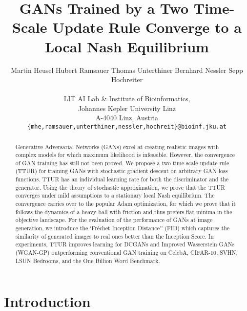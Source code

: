 \documentclass{article}
\begin{document}
\title{GANs Trained by a Two Time-Scale Update Rule
Converge to a Local Nash Equilibrium}

\author{
 Martin Heusel
 \And
 Hubert Ramsauer
 \And
 Thomas Unterthiner
\And
 Bernhard Nessler
 \And
 Sepp Hochreiter\\
  \\
LIT AI Lab \& Institute of Bioinformatics, \\
 Johannes Kepler University Linz\\
 A-4040 Linz, Austria\\
\texttt{\{mhe,ramsauer,unterthiner,nessler,hochreit\}@bioinf.jku.at}
}

\maketitle

\begin{abstract}
Generative Adversarial Networks (GANs) excel at creating realistic images with
complex models for which maximum likelihood is infeasible. However, the
convergence of GAN training has still not been proved.
We propose a two time-scale update rule (TTUR) for training GANs with stochastic
gradient descent on arbitrary GAN loss functions.
TTUR has an individual learning rate for both the discriminator
and the generator. Using the theory of stochastic approximation, we
prove that the TTUR converges under mild assumptions to a stationary local Nash equilibrium.
The convergence carries over to the popular Adam optimization, for which we
prove that it follows the dynamics of a heavy ball with friction and thus
prefers flat minima in the objective landscape.
For the evaluation of the performance of GANs at image generation, we introduce
the `Fr\'{e}chet Inception Distance'' (FID) which captures the similarity of
generated images to real ones better than the Inception Score. In experiments,
TTUR improves learning for DCGANs and Improved Wasserstein GANs (WGAN-GP)
outperforming conventional GAN training on CelebA, CIFAR-10, SVHN, LSUN
Bedrooms, and the One Billion Word Benchmark.
\end{abstract}

\section*{Introduction}
\label{sec:introduction}
\end{document}
